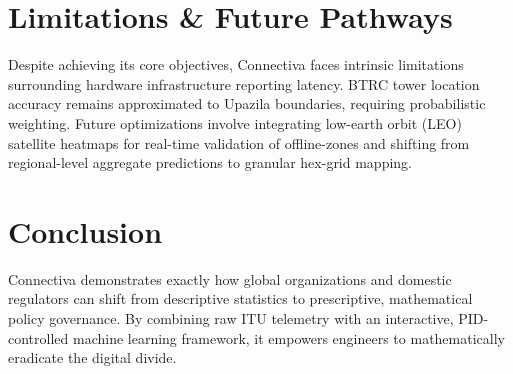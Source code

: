 \documentclass[11pt,a4paper]{article}
\begin{document}
\section{Limitations \& Future Pathways}

Despite achieving its core objectives, Connectiva faces intrinsic limitations surrounding hardware infrastructure reporting latency. BTRC tower location accuracy remains approximated to Upazila boundaries, requiring probabilistic weighting. Future optimizations involve integrating low-earth orbit (LEO) satellite heatmaps for real-time validation of offline-zones and shifting from regional-level aggregate predictions to granular hex-grid mapping.

\section{Conclusion}

Connectiva demonstrates exactly how global organizations and domestic regulators can shift from descriptive statistics to prescriptive, mathematical policy governance. By combining raw ITU telemetry with an interactive, PID-controlled machine learning framework, it empowers engineers to mathematically eradicate the digital divide.
\end{document}
